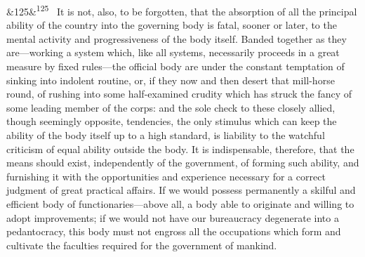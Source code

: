 \documentclass[12pt]{article}
\newcommand{\para}[1][]{\par\noindent\ifx&#1&\else\textsuperscript{\footnotesize #1}~\fi}
\begin{document}
\para[125] It is not, also, to be forgotten, that the absorption of all the principal ability of the country into the governing body is fatal, sooner or later, to the mental activity and progressiveness of the body itself. Banded together as they are---working a system which, like all systems, necessarily proceeds in a great measure by fixed rules---the official body are under the constant temptation of sinking into indolent routine, or, if they now and then desert that mill-horse round, of rushing into some half-examined crudity which has struck the fancy of some leading member of the corps: and the sole check to these closely allied, though seemingly opposite, tendencies, the only stimulus which can keep the ability of the body itself up to a high standard, is liability to the watchful criticism of equal ability outside the body. It is indispensable, therefore, that the means should exist, independently of the government, of forming such ability, and furnishing it with the opportunities and experience necessary for a correct judgment of great practical affairs. If we would possess permanently a skilful and efficient body of functionaries---above all, a body able to originate and willing to adopt improvements; if we would not have our bureaucracy degenerate into a pedantocracy, this body must not engross all the occupations which form and cultivate the faculties required for the government of mankind.
\end{document}
